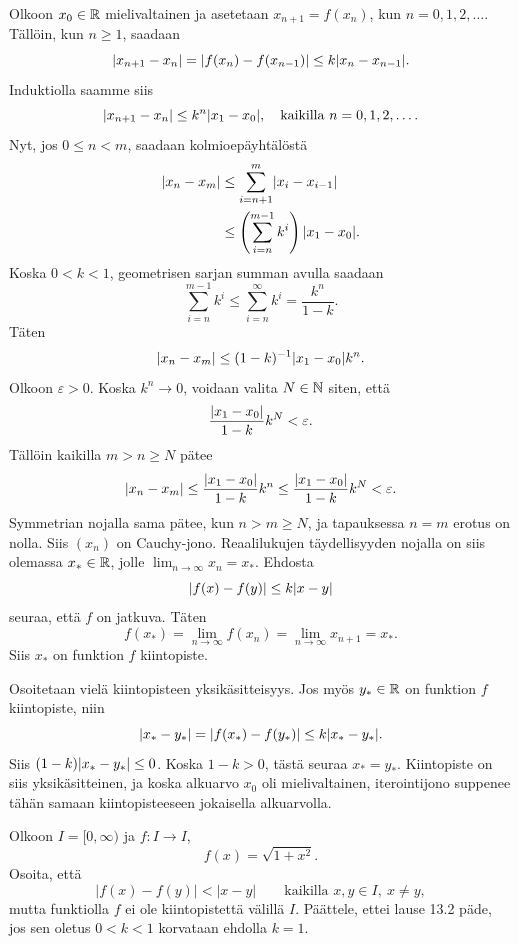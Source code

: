 \documentclass[11pt,a4paper]{amsart}
\begin{document}
\begin{solution}
  Olkoon \(x_0 \in \mathbb{R}\) mielivaltainen ja asetetaan
  \(x_{n + 1} = f(x_n)\), kun \(n = 0, 1, 2, \ldots\).
  Tällöin, kun \(n \geq 1\), saadaan
  \[
    \lvert x_{n + 1} - x_n\rvert = \lvert f(x_n) - f(x_{n - 1})\rvert \leq
    k\lvert x_n - x_{n - 1}\rvert.
  \]
  Induktiolla saamme siis
  \[
    \lvert x_{n + 1} - x_n\rvert \leq k^{n}\lvert x_1 - x_0\rvert, \quad
    \text{kaikilla } n = 0, 1, 2, \ldots.
  \]
  Nyt, jos \(0 \leq n < m\), saadaan kolmioepäyhtälöstä
  \[
    \begin{aligned}
      \lvert x_n - x_m\rvert &\leq \sum_{i = n + 1}^{m} \lvert x_i - x_{i - 1}\rvert \\
      &\leq \left(\sum_{i = n}^{m - 1} k^i\right)\lvert x_1 - x_0\rvert.
    \end{aligned}
  \]
  Koska \(0 < k < 1\), geometrisen sarjan summan avulla saadaan
  \[
    \sum_{i = n}^{m - 1} k^i \leq \sum_{i = n}^{\infty} k^i
    = \frac{k^n}{1 - k}.
  \]
  Täten
  \[
    \lvert x_n - x_m\rvert \leq (1 - k)^{-1}\lvert x_1 - x_0\rvert k^n.
  \]
  Olkoon \(\varepsilon > 0\). Koska \(k^n \to 0\), voidaan valita
  \(N \in \mathbb{N}\) siten, että
  \[
    \frac{\lvert x_1 - x_0\rvert}{1 - k}k^N < \varepsilon.
  \]
  Tällöin kaikilla \(m > n \geq N\) pätee
  \[
    \lvert x_n - x_m\rvert
    \leq \frac{\lvert x_1 - x_0\rvert}{1 - k}k^n
    \leq \frac{\lvert x_1 - x_0\rvert}{1 - k}k^N
    < \varepsilon.
  \]
  Symmetrian nojalla sama pätee, kun \(n > m \geq N\), ja tapauksessa
  \(n = m\) erotus on nolla. Siis \((x_n)\) on Cauchy-jono.
  Reaalilukujen täydellisyyden nojalla on siis olemassa \(x_* \in \mathbb{R}\), jolle
  \(\lim_{n \to \infty} x_n = x_*\). Ehdosta
  \[
    \lvert f(x) - f(y)\rvert \leq k\lvert x - y\rvert
  \]
  seuraa, että \(f\) on jatkuva. Täten
  \[
    f(x_*) = \lim_{n \to \infty} f(x_n) = \lim_{n \to \infty} x_{n + 1} = x_*.
  \]
  Siis \(x_*\) on funktion \(f\) kiintopiste.

  Osoitetaan vielä kiintopisteen yksikäsitteisyys. Jos myös \(y_* \in \mathbb{R}\)
  on funktion \(f\) kiintopiste, niin
  \[
    \lvert x_* - y_*\rvert = \lvert f(x_*) - f(y_*)\rvert \leq k\lvert x_* - y_*\rvert.
  \]
  Siis \((1 - k)\lvert x_* - y_*\rvert \leq 0\). Koska \(1 - k > 0\), tästä
  seuraa \(x_* = y_*\). Kiintopiste on siis yksikäsitteinen, ja koska
  alkuarvo \(x_0\) oli mielivaltainen, iterointijono suppenee tähän samaan
  kiintopisteeseen jokaisella alkuarvolla.
\end{solution}

\begin{exercise}
  Olkoon \(I=[0,\infty)\) ja \(f\colon I\to I\),
  \[
    f(x)=\sqrt{1+x^2}.
  \]
  Osoita, että
  \[
    \lvert f(x)-f(y)\rvert<\lvert x-y\rvert
    \qquad\text{kaikilla }x,y\in I,\ x\neq y,
  \]
  mutta funktiolla \(f\) ei ole kiintopistettä välillä \(I\).
  Päättele, ettei lause 13.2 päde, jos sen oletus \(0<k<1\)
  korvataan ehdolla \(k=1\).
\end{exercise}
\end{document}
